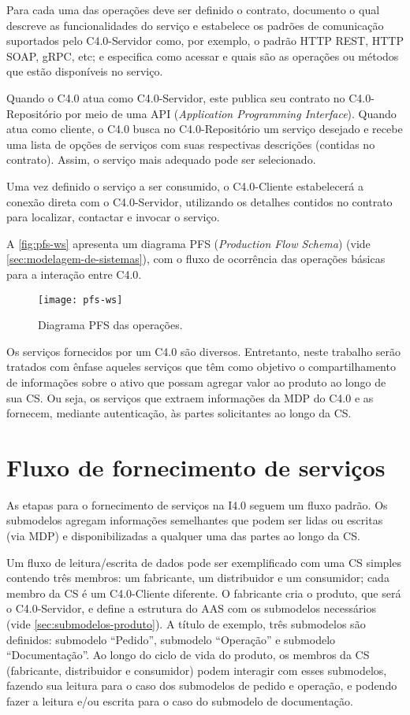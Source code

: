 Para cada uma das operações deve ser definido o contrato, documento o qual descreve as funcionalidades do serviço e estabelece os padrões de comunicação suportados pelo C4.0-Servidor como, por exemplo, o padrão HTTP REST, HTTP SOAP, gRPC, etc; e especifica como acessar e quais são as operações ou métodos que estão disponíveis no serviço.

Quando o C4.0 atua como C4.0-Servidor, este publica seu contrato no C4.0-Repositório por meio de uma API (\textit{Application Programming Interface}). Quando atua como cliente, o C4.0 busca no C4.0-Repositório um serviço desejado e recebe uma lista de opções de serviços com suas respectivas descrições (contidas no contrato). Assim, o serviço mais adequado pode ser selecionado.

Uma vez definido o serviço a ser consumido, o C4.0-Cliente estabelecerá a conexão direta com o C4.0-Servidor, utilizando os detalhes contidos no contrato para localizar, contactar e invocar o serviço.

A \autoref{fig:pfs-ws} apresenta um diagrama PFS (\textit{Production Flow Schema}) (vide \autoref{sec:modelagem-de-sistemas}), com o fluxo de ocorrência das operações básicas para a interação entre C4.0.

\begin{figure}[htb]
	\centering
	\texttt{[image: pfs-ws]}
	\caption{Diagrama PFS das operações.}
	\label{fig:pfs-ws}
\end{figure}

Os serviços fornecidos por um C4.0 são diversos. Entretanto, neste trabalho serão tratados com ênfase aqueles serviços que têm como objetivo o compartilhamento de informações sobre o ativo que possam agregar valor ao produto ao longo de sua CS. Ou seja, os serviços que extraem informações da MDP do C4.0 e as fornecem, mediante autenticação, às partes solicitantes ao longo da CS.

\section{Fluxo de fornecimento de serviços}
\label{sec:fluxo-de-fornecimento-de-servicos}

As etapas para o fornecimento de serviços na I4.0 seguem um fluxo padrão. Os submodelos agregam informações semelhantes que podem ser lidas ou escritas (via MDP) e disponibilizadas a qualquer uma das partes ao longo da CS.

Um fluxo de leitura/escrita de dados pode ser exemplificado com uma CS simples contendo três membros: um fabricante, um distribuidor e um consumidor; cada membro da CS é um C4.0-Cliente diferente. O fabricante cria o produto, que será o C4.0-Servidor, e define a estrutura do AAS com os submodelos necessários (vide \autoref{sec:submodelos-produto}). A título de exemplo, três submodelos são definidos: submodelo ``Pedido'', submodelo ``Operação'' e submodelo ``Documentação''. Ao longo do ciclo de vida do produto, os membros da CS (fabricante, distribuidor e consumidor) podem interagir com esses submodelos, fazendo sua leitura para o caso dos submodelos de pedido e operação, e podendo fazer a leitura e/ou escrita para o caso do submodelo de documentação.

